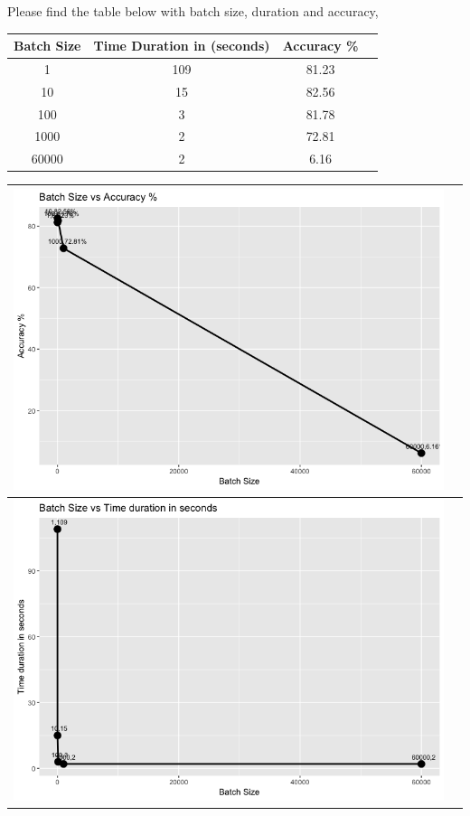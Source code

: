 \documentclass[a4paper,10pt]{article}
\begin{document}
Please find the table below with batch size, duration and accuracy,
\begin{center}
	\setlength{\arrayrulewidth}{1.0pt}
	\begin{tabular}{|c|c|c|c|}
		\hline
		 \textbf{Batch Size} & \textbf{Time Duration in (seconds)} & \textbf{Accuracy \%}\\ [1.5ex]
		\hline
		1 & 109 &81.23\\
		\hline
		10 & 15 &82.56\\
		\hline
		100 & 3 &81.78\\
		\hline
		1000 & 2 &72.81\\
		\hline
		60000 & 2 &6.16\\
		\hline
	\end{tabular}
\end{center} 
\begin{center}
	\setlength{\arrayrulewidth}{1.0pt}
	\begin{tabular}{|c|c|}
		\hline
		\includegraphics[width=.6\textwidth]{Batch_Size_Accuracy.png}\par\\
		\hline
		\includegraphics[width=.6\textwidth]{Batch_Size_Time.png}\par\\
		\hline
	\end{tabular}
\end{center}
\end{document}
